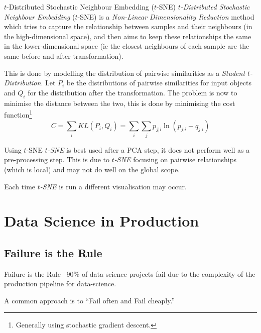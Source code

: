 \documentclass[11pt,a4paper]{article}
\begin{document}
  \begin{definition}{$t$-Distributed Stochastic Neighbour Embedding ($t$-SNE)}
    \textit{$t$-Distributed Stochastic Neighbour Embedding} ($t$-SNE) is a \textit{Non-Linear Dimensionality Reduction} method which tries to capture the relationship between samples and their neighbours (in the high-dimensional space), and then aims to keep these relationships the same in the lower-dimensional space (ie the closest neighbours of each sample are the same before and after transformation).
    \par This is done by modelling the distribution of pairwise similarities as a \textit{Student $t$-Distribution}. Let $P_i$ be the distributions of pairwise similarities for input objects and $Q_i$ for the distribution after the transformation. The problem is now to minimise the distance between the two, this is done by minimising the cost function\footnote{Generally using stochastic gradient descent.}
    \[ C=\sum_iKL(P_i,Q_i)=\sum_i\sum_jp_{j|i}\ln(p_{j|i}-q_{j|i}) \]
  \end{definition}

  \begin{remark}{Using $t$-SNE}
    \textit{$t$-SNE} is best used after a PCA step, it does not perform well as a pre-processing step. This is due to \textit{$t$-SNE} focusing on pairwise relationships (which is local) and may not do well on the global scope.
    \par Each time \textit{$t$-SNE} is run a different visualisation may occur.
  \end{remark}

\section{Data Science in Production}\label{sec_production}

\subsection{Failure is the Rule}

  \begin{remark}{Failure is the Rule}
    ~90\% of data-science projects fail due to the complexity of the production pipeline for data-science.
    \par A common approach is to ``Fail often and Fail cheaply.''
  \end{remark}
\end{document}
